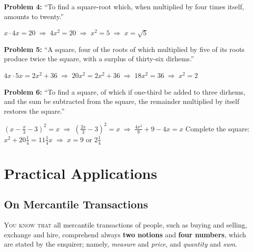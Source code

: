 \documentclass[11pt,a4paper]{book}
\begin{document}
\textbf{Problem 4:} ``To find a square-root which, when multiplied by
four times itself, amounts to twenty.''

\begin{mathbox}
$x \cdot 4x = 20 \;\Rightarrow\; 4x^2 = 20 \;\Rightarrow\; x^2 = 5 \;\Rightarrow\; x = \sqrt{5}$
\end{mathbox}

\textbf{Problem 5:} ``A square, four of the roots of which multiplied by
five of its roots produce twice the square, with a surplus of thirty-six
dirhems.''

\begin{mathbox}
$4x \cdot 5x = 2x^2 + 36 \;\Rightarrow\; 20x^2 = 2x^2 + 36 \;\Rightarrow\; 18x^2 = 36 \;\Rightarrow\; x^2 = 2$
\end{mathbox}

\textbf{Problem 6:} ``To find a square, of which if one-third be added to
three dirhems, and the sum be subtracted from the square, the remainder
multiplied by itself restores the square.''

\begin{mathbox}
$\left(x - \tfrac{x}{3} - 3\right)^2 = x \;\Rightarrow\; \left(\tfrac{2x}{3} - 3\right)^2 = x
\;\Rightarrow\; \tfrac{4x^2}{9} + 9 - 4x = x$
Complete the square: $x^2 + 20\tfrac{1}{4} = 11\tfrac{1}{4}x \;\Rightarrow\; x = 9 \text{ or } 2\tfrac{1}{4}$
\end{mathbox}

\newpage

\part{Practical Applications}
\label{part:practical}

\chapter{On Mercantile Transactions}
\label{ch:mercantile}

\lettrine[lines=3, lhang=0.33, nindent=0em, findent=3pt]{
\textcolor{dropgold}{Y}}{ou know that} all mercantile transactions of people, such as buying and
selling, exchange and hire, comprehend always \textbf{two notions} and
\textbf{four numbers}, which are stated by the enquirer; namely,
\textit{measure} and \textit{price}, and \textit{quantity} and \textit{sum}.
\end{document}
